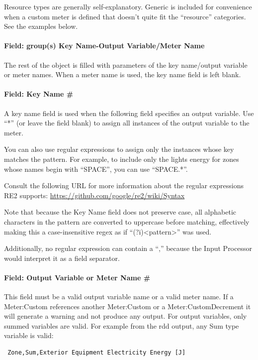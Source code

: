 Resource types are generally self-explanatory. Generic is included for convenience when a custom meter is defined that doesn't quite fit the ``resource'' categories. See the examples below.

\paragraph{Field: group(s) Key Name-Output Variable/Meter Name}\label{field-groups-key-name-output-variablemeter-name}

The rest of the object is filled with parameters of the key name/output variable or meter names. When a meter name is used, the key name field is left blank.

\paragraph{Field: Key Name \#}\label{field-key-name}

A key name field is used when the following field specifies an output variable.
Use ``*'' (or leave the field blank) to assign all instances of the output variable to the meter.

You can also use regular expressions to assign only the instances whose key matches the pattern.
For example, to include only the lights energy for zones whose names begin with ``SPACE'', you can use ``SPACE.*''.

Consult the following URL for more information about the regular expressions RE2 supports: \url{https://github.com/google/re2/wiki/Syntax}

Note that because the Key Name field does not preserve case, all alphabetic characters in the pattern are converted to uppercase before matching, effectively making this a case-insensitive regex as if ``(?i)<pattern>'' was used.

Additionally, no regular expression can contain a ``,'' because the Input Processor would interpret it as a field separator.

\paragraph{Field: Output Variable or Meter Name \#}\label{field-output-variable-or-meter-name}

This field must be a valid output variable name or a valid meter name. If a Meter:Custom references another Meter:Custom or a Meter:CustomDecrement it will generate a warning and not produce any output.
For output variables, only summed variables are valid. For example from the rdd output, any Sum type variable is valid:
\begin{lstlisting}
 Zone,Sum,Exterior Equipment Electricity Energy [J]
\end{lstlisting}

